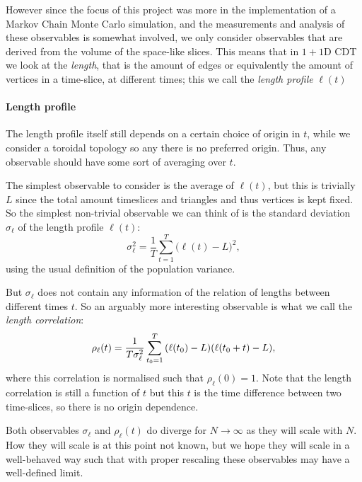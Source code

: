 However since the focus of this project was more in the implementation of a Markov Chain Monte Carlo simulation, and the measurements and analysis of these observables is somewhat involved, we only consider observables that are derived from the volume of the space-like slices.
This means that in $1 + 1$D CDT we look at the \emph{length}, that is the amount of edges or equivalently the amount of vertices in a time-slice, at different times; this we call the \emph{length profile} $\ell(t)$

\paragraph{Length profile}
The length profile itself still depends on a certain choice of origin in $t$, while we consider a toroidal topology so any there is no preferred origin. Thus, any observable should have some sort of averaging over $t$.

The simplest observable to consider is the average of $\ell(t)$, but this is trivially $L$ since the total amount timeslices and triangles and thus vertices is kept fixed.
So the simplest non-trivial observable we can think of is the standard deviation $\sigma_\ell$ of the length profile $\ell(t)$:
\begin{equation}
    \sigma_\ell^2 = \frac{1}{T} \sum_{t = 1}^{T} \Big(\ell(t) - L\Big)^2,
\end{equation}
using the usual definition of the population variance.

But $\sigma_\ell$ does not contain any information of the relation of lengths between different times $t$.
So an arguably more interesting observable is what we call the \emph{length correlation}:
\begin{equation}
    \rho_\ell(t) = \frac{1}{T \sigma_\ell^2} \sum_{t_0 = 1}^{T} \qty(\ell(t_0) - L)\qty(\ell(t_0 + t) - L),
\end{equation}
where this correlation is normalised such that $\rho_\ell(0) = 1$.
Note that the length correlation is still a function of $t$ but this $t$ is the time difference between two time-slices, so there is no origin dependence.

Both observables $\sigma_\ell$ and $\rho_\ell(t)$ do diverge for $N \rightarrow \infty$ as they will scale with $N$.
How they will scale is at this point not known, but we hope they will scale in a well-behaved way such that with proper rescaling these observables may have a well-defined limit.